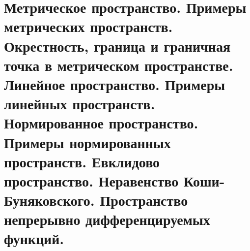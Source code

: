 \documentclass[__main__.tex]{subfiles}
\begin{document}
\section{Метрическое пространство. Примеры метрических пространств. Окрестность, граница и граничная точка в метрическом пространстве. Линейное пространство. Примеры линейных пространств. Нормированное пространство. Примеры нормированных пространств. Евклидово пространство. Неравенство Коши-Буняковского. Пространство непрерывно дифференцируемых функций.}
\end{document}
